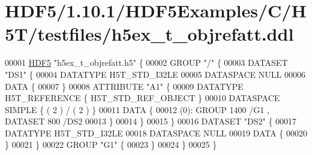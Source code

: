 \hypertarget{_h_d_f5_21_810_81_2_h_d_f5_examples_2_c_2_h5_t_2testfiles_2h5ex__t__objrefatt_8ddl_source}{}\section{H\+D\+F5/1.10.1/\+H\+D\+F5\+Examples/\+C/\+H5\+T/testfiles/h5ex\+\_\+t\+\_\+objrefatt.ddl}
\label{_h_d_f5_21_810_81_2_h_d_f5_examples_2_c_2_h5_t_2testfiles_2h5ex__t__objrefatt_8ddl_source}

\begin{DoxyCode}
00001 \hyperlink{namespace_h_d_f5}{HDF5} \textcolor{stringliteral}{"h5ex\_t\_objrefatt.h5"} \{
00002 GROUP \textcolor{stringliteral}{"/"} \{
00003    DATASET \textcolor{stringliteral}{"DS1"} \{
00004       DATATYPE  H5T\_STD\_I32LE
00005       DATASPACE  NULL
00006       DATA \{
00007       \}
00008       ATTRIBUTE \textcolor{stringliteral}{"A1"} \{
00009          DATATYPE  H5T\_REFERENCE \{ H5T\_STD\_REF\_OBJECT \}
00010          DATASPACE  SIMPLE \{ ( 2 ) / ( 2 ) \}
00011          DATA \{
00012          (0): GROUP 1400 /G1 , DATASET 800 /DS2 
00013          \}
00014       \}
00015    \}
00016    DATASET \textcolor{stringliteral}{"DS2"} \{
00017       DATATYPE  H5T\_STD\_I32LE
00018       DATASPACE  NULL
00019       DATA \{
00020       \}
00021    \}
00022    GROUP \textcolor{stringliteral}{"G1"} \{
00023    \}
00024 \}
00025 \}
\end{DoxyCode}
